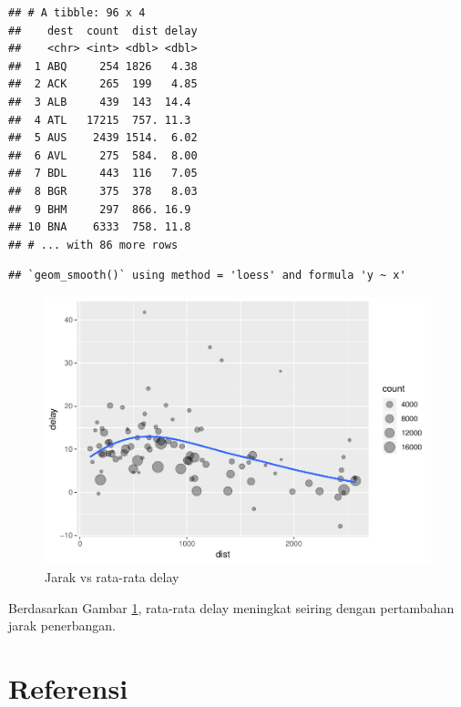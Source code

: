 \documentclass[]{book}
\begin{document}
\begin{verbatim}
## # A tibble: 96 x 4
##    dest  count  dist delay
##    <chr> <int> <dbl> <dbl>
##  1 ABQ     254 1826   4.38
##  2 ACK     265  199   4.85
##  3 ALB     439  143  14.4 
##  4 ATL   17215  757. 11.3 
##  5 AUS    2439 1514.  6.02
##  6 AVL     275  584.  8.00
##  7 BDL     443  116   7.05
##  8 BGR     375  378   8.03
##  9 BHM     297  866. 16.9 
## 10 BNA    6333  758. 11.8 
## # ... with 86 more rows
\end{verbatim}

\begin{verbatim}
## `geom_smooth()` using method = 'loess' and formula 'y ~ x'
\end{verbatim}

\begin{figure}

{\centering \includegraphics[width=0.7\linewidth]{EnvStat_files/figure-latex/distvsave-1} 

}

\caption{Jarak vs rata-rata delay}\label{fig:distvsave}
\end{figure}

Berdasarkan Gambar \ref{fig:distvsave}, rata-rata delay meningkat
seiring dengan pertambahan jarak penerbangan.

\section{Referensi}\label{referensi-2}
\end{document}
